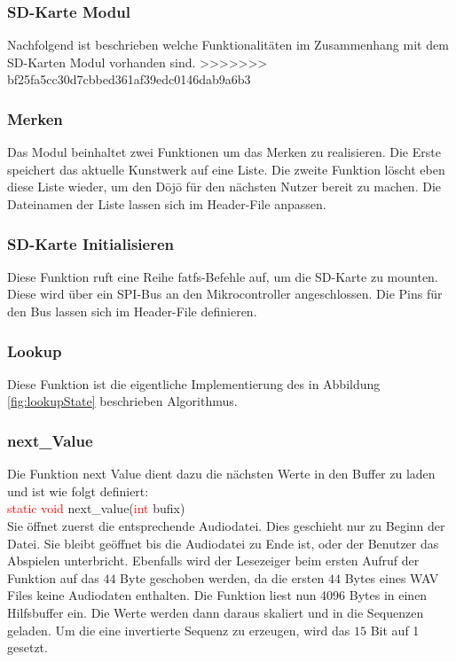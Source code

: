 \subsubsection{SD-Karte Modul}
Nachfolgend ist beschrieben welche Funktionalitäten im Zusammenhang mit dem SD-Karten Modul vorhanden sind.
>>>>>>> bf25fa5cc30d7cbbed361af39edc0146dab9a6b3

\subsubsection*{Merken}
Das Modul beinhaltet zwei Funktionen um das Merken zu realisieren. Die Erste speichert das aktuelle Kunstwerk auf eine Liste. Die zweite Funktion löscht eben diese Liste wieder, um den Dōjō für den nächsten Nutzer bereit zu machen. Die Dateinamen der Liste lassen sich im Header-File anpassen.

\subsubsection*{SD-Karte Initialisieren}
Diese Funktion ruft eine Reihe fatfs-Befehle auf, um die SD-Karte zu mounten. Diese wird über ein SPI-Bus an den Mikrocontroller angeschlossen. Die Pins für den Bus lassen sich im Header-File definieren.

\subsubsection*{Lookup}
Diese Funktion ist die eigentliche Implementierung des in Abbildung \ref{fig:lookupState} beschrieben Algorithmus.

\subsubsection*{next\_Value}
Die Funktion next Value dient dazu die nächsten Werte in den Buffer zu laden und ist wie folgt definiert:\\
\textcolor{red}{static void} next\_value(\textcolor{red}{int} bufix)\\
Sie öffnet zuerst die entsprechende Audiodatei. Dies geschieht nur zu Beginn der Datei. Sie bleibt geöffnet bis die Audiodatei zu Ende ist, oder der Benutzer das Abspielen unterbricht. Ebenfalls wird der Lesezeiger beim ersten Aufruf der Funktion auf das $44$ Byte geschoben werden, da die ersten $44$ Bytes eines WAV Files keine Audiodaten enthalten. Die Funktion liest nun 4096 Bytes in einen Hilfsbuffer ein. Die Werte werden dann daraus skaliert und in die Sequenzen geladen. Um die eine invertierte Sequenz zu erzeugen, wird das $15$ Bit auf 1 gesetzt.

